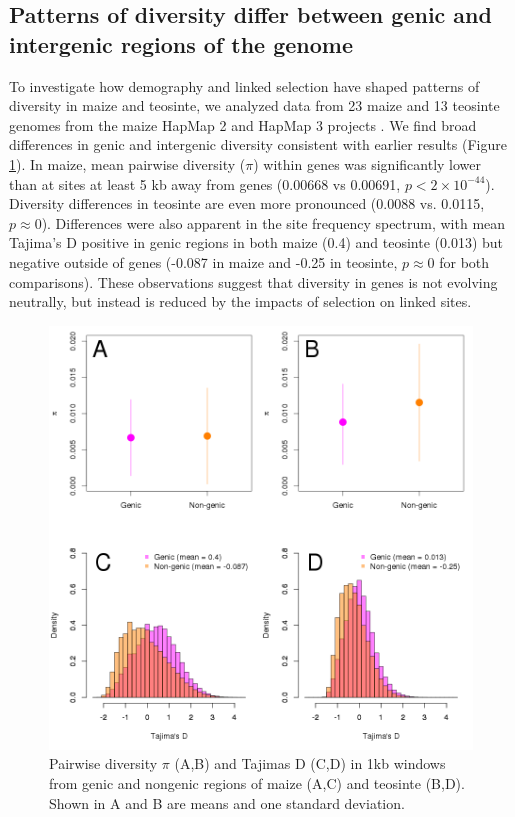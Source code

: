 \documentclass{pnastwo}
\begin{document}
\begin{article}
\subsection{Patterns of diversity differ between genic and  intergenic regions of the genome} %
To investigate how demography and linked selection have shaped patterns of diversity in maize and teosinte, we analyzed data from 23 maize and 13 teosinte genomes from the maize HapMap 2 and HapMap 3 projects \cite{chia2012, hapmap3}.
We find broad differences in genic and intergenic diversity consistent with earlier results  \cite{hufford2012}(Figure \ref{fig:diversity}).  In maize, mean pairwise diversity ($\pi$) within genes was significantly lower than at sites at least 5 kb away from genes (0.00668 vs 0.00691, $p<2\times 10^{-44}$). 
Diversity differences in teosinte are even more pronounced (0.0088 vs. 0.0115, $p\approx 0$). 
Differences were also apparent in the site frequency spectrum, with mean Tajima's D positive in genic regions in both maize (0.4) and teosinte (0.013) but negative outside of genes (-0.087 in maize and -0.25 in teosinte, $p\approx 0$ for both comparisons).
These observations suggest that diversity in genes is not evolving neutrally, but instead is reduced by the impacts of selection on linked sites. 

\begin{figure}[!tb]
\begin{center}
  \includegraphics[width=.45\textwidth] {FigsAndFiles/Pi_and_Tajima.png}
\end{center}
\caption{Pairwise diversity $\pi$ (A,B) and Tajimas D (C,D) in 1kb windows from genic and nongenic regions of maize (A,C) and teosinte (B,D). Shown in A and B are means and one standard deviation.   \label{fig:diversity} }
\end{figure}


\end{article}
\end{document}
